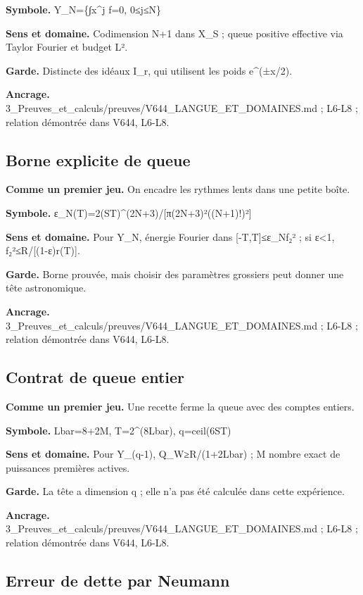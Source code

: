 \documentclass[
  9pt,
  a4paper,
]{article}
\begin{document}
\textbf{Symbole.} Y\_N=\{∫x\^{}j f=0, 0≤j≤N\}

\textbf{Sens et domaine.} Codimension N+1 dans X\_S ; queue positive
effective via Taylor Fourier et budget L².

\textbf{Garde.} Distincte des idéaux I\_r, qui utilisent les poids
e\^{}(±x/2).

\textbf{Ancrage.}
3\_Preuves\_et\_calculs/preuves/V644\_LANGUE\_ET\_DOMAINES.md ; L6-L8 ;
relation démontrée dans V644, L6-L8.

\hypertarget{borne-explicite-de-queue}{%
\subsection{Borne explicite de queue}\label{borne-explicite-de-queue}}

\textbf{Comme un premier jeu.} On encadre les rythmes lents dans une
petite boîte.

\textbf{Symbole.} ε\_N(T)=2(ST)\^{}(2N+3)/{[}π(2N+3)²((N+1)!)²{]}

\textbf{Sens et domaine.} Pour Y\_N, énergie Fourier dans
{[}-T,T{]}≤ε\_N\textbar\textbar f\textbar\textbar₂² ; si ε\textless1,
\textbar\textbar f\textbar\textbar₂²≤R/{[}(1-ε)r(T){]}.

\textbf{Garde.} Borne prouvée, mais choisir des paramètres grossiers
peut donner une tête astronomique.

\textbf{Ancrage.}
3\_Preuves\_et\_calculs/preuves/V644\_LANGUE\_ET\_DOMAINES.md ; L6-L8 ;
relation démontrée dans V644, L6-L8.

\hypertarget{contrat-de-queue-entier}{%
\subsection{Contrat de queue entier}\label{contrat-de-queue-entier}}

\textbf{Comme un premier jeu.} Une recette ferme la queue avec des
comptes entiers.

\textbf{Symbole.} Lbar=8+2M, T=2\^{}(8Lbar), q=ceil(6ST)

\textbf{Sens et domaine.} Pour Y\_(q-1), Q\_W≥R/(1+2Lbar) ; M nombre
exact de puissances premières actives.

\textbf{Garde.} La tête a dimension q ; elle n'a pas été calculée dans
cette expérience.

\textbf{Ancrage.}
3\_Preuves\_et\_calculs/preuves/V644\_LANGUE\_ET\_DOMAINES.md ; L6-L8 ;
relation démontrée dans V644, L6-L8.

\hypertarget{erreur-de-dette-par-neumann}{%
\subsection{Erreur de dette par
Neumann}\label{erreur-de-dette-par-neumann}}
\end{document}
